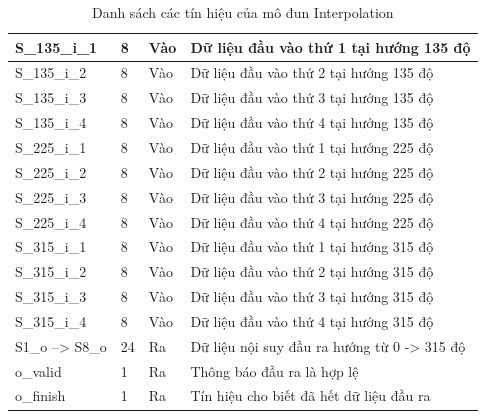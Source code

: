 \begin{table}[H]
\begin{tabular}{|p{3cm} p{2cm} p{2cm} p{8cm}|}
        \hline
        S\_135\_i\_1 & 8 & Vào & Dữ liệu đầu vào thứ 1 tại hướng 135 độ \\
        \hline
        S\_135\_i\_2 & 8 & Vào & Dữ liệu đầu vào thứ 2 tại hướng 135 độ \\
        \hline
        S\_135\_i\_3 & 8 & Vào & Dữ liệu đầu vào thứ 3 tại hướng 135 độ \\
        \hline
        S\_135\_i\_4 & 8 & Vào & Dữ liệu đầu vào thứ 4 tại hướng 135 độ \\
        \hline
        S\_225\_i\_1 & 8 & Vào & Dữ liệu đầu vào thứ 1 tại hướng 225 độ \\
        \hline
        S\_225\_i\_2 & 8 & Vào & Dữ liệu đầu vào thứ 2 tại hướng 225 độ \\
        \hline
        S\_225\_i\_3 & 8 & Vào & Dữ liệu đầu vào thứ 3 tại hướng 225 độ \\
        \hline
        S\_225\_i\_4 & 8 & Vào & Dữ liệu đầu vào thứ 4 tại hướng 225 độ \\
        \hline
        S\_315\_i\_1 & 8 & Vào & Dữ liệu đầu vào thứ 1 tại hướng 315 độ \\
        \hline
        S\_315\_i\_2 & 8 & Vào & Dữ liệu đầu vào thứ 2 tại hướng 315 độ \\
        \hline
        S\_315\_i\_3 & 8 & Vào & Dữ liệu đầu vào thứ 3 tại hướng 315 độ \\
        \hline
        S\_315\_i\_4 & 8 & Vào & Dữ liệu đầu vào thứ 4 tại hướng 315 độ \\
        \hline
        S1\_o --> S8\_o & 24 & Ra & Dữ liệu nội suy đầu ra hướng từ 0 -> 315 độ \\
        \hline
        o\_valid & 1 & Ra & Thông báo đầu ra là hợp lệ\\
        \hline
        o\_finish & 1 & Ra & Tín hiệu cho biết đã hết dữ liệu đầu ra \\
        \hline
    \end{tabular}
    \caption{Danh sách các tín hiệu của mô đun Interpolation}
    \label{tab:signalListInterpolation}
\end{table}












